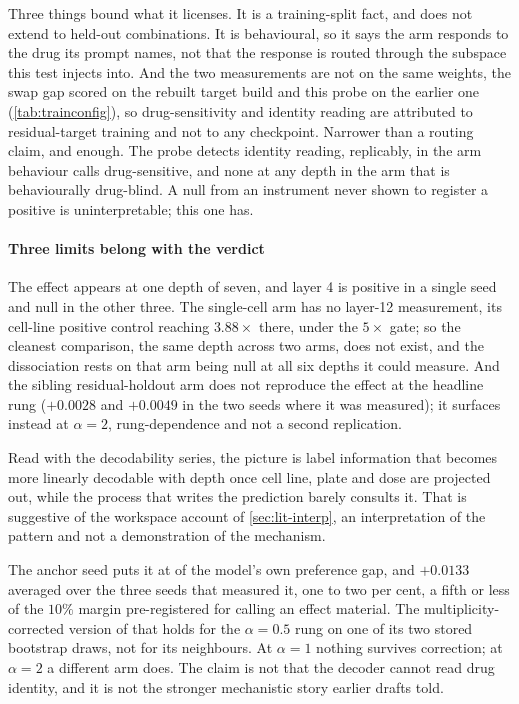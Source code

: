 Three things bound what it licenses. It is a training-split fact, and does not
extend to held-out combinations. It is behavioural, so it says the arm responds
to the drug its prompt names, not that the response is routed through the
subspace this test injects into. And the two measurements are not on the same
weights, the swap gap scored on the rebuilt target build and this probe on the
earlier one (\cref{tab:trainconfig}), so drug-sensitivity and identity reading
are attributed to residual-target training and not to any checkpoint. Narrower
than a routing claim, and enough. The probe detects identity reading, replicably,
in the arm behaviour calls drug-sensitive, and none at any depth in the arm that
is behaviourally drug-blind. A null from an instrument never shown to register a
positive is uninterpretable; this one has.

\paragraph{Three limits belong with the verdict} The effect appears at one depth
of seven, and layer 4 is positive in a single seed and null in the other three.
The single-cell arm has no layer-12 measurement, its cell-line positive control
reaching $3.88\times$ there, under the $5\times$ gate; so the cleanest
comparison, the same depth across two arms, does not exist, and the dissociation
rests on that arm being null at all six depths it could measure. And the sibling
residual-holdout arm does not reproduce the effect at the headline rung
($+0.0028$ and $+0.0049$ in the two seeds where it was measured); it surfaces
instead at $\alpha = 2$, rung-dependence and not a second replication.

Read with the decodability series, the picture is label information that becomes
more linearly decodable with depth once cell line, plate and dose are projected
out, while the process that writes the prediction barely consults it. That is
suggestive of the workspace account of \cref{sec:lit-interp}, an interpretation
of the pattern and not a demonstration of the mechanism.

\begin{claim}
The anchor seed puts it at  of the model's own
preference gap, and $+0.0133$ averaged over the three seeds that measured it, one
to two per cent, a fifth or less of the $10\%$ margin pre-registered for calling
an effect material. The multiplicity-corrected version of that holds for the
$\alpha = 0.5$ rung on one of its two stored bootstrap draws, not for its
neighbours. At $\alpha = 1$ nothing survives correction; at $\alpha = 2$ a
different arm does. The claim is not that the decoder cannot read drug identity,
and it is not the stronger mechanistic story earlier drafts told.
\end{claim}

